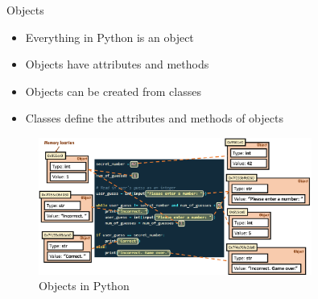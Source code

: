 \documentclass{beamer}
\begin{document}
\begin{frame}{Objects}
    \begin{itemize}
        \item Everything in Python is an object
        \item Objects have attributes and methods
        \item Objects can be created from classes
        \item Classes define the attributes and methods of objects
    \end{itemize}
\end{frame}
\begin{frame}
    \begin{figure}
        \centering
        \includegraphics[width=0.8\textwidth]{pics/objects.png}
        \caption{Objects in Python}
    \end{figure}
\end{frame}
\end{document}
